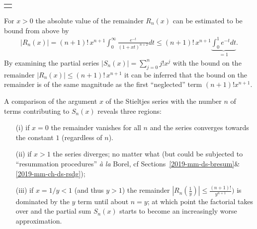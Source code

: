 {\begin{marginfigure}
{\begin{center}
\begin{tabular}{c}
\begin{tikzpicture} [ scale=0.53, every mark/.append style={mark size=2pt} ]
\begin{axis}
\end{axis}
\end{tikzpicture}
\end{tabular}
\end{center}
\caption{The series approximation error   $F_n(x)= -\frac{e^\frac{1}{x}}{x}  \left[  \gamma - \log x +\sum_{j=1}^n \frac{(-1)^j}{j!j x^j} \right] -S(x)$
of the convergent Stieltjes series~(\ref{2019-m-ch-ds-Stieltjes-series})
for $x=\frac{1}{5}$, and
$E_n(x)=S_n(x) -S(x)$
of the Stieltjes series~(\ref{2019-m-ch-ds-asymptotic-Stieltjes-series})  as a function of increasing $n$
for $x\in \left\{ \frac{1}{5},\frac{1}{10},\frac{1}{15}\right\}$.}
  \label{2018-mm-ferrorS}
}
\end{marginfigure}
%
%
%
%
For $x>0$ the absolute value of the remainder $R_n(x)$
can be estimated to be bound from above by
\begin{equation}
\begin{split}
\vert R_n(x)\vert
=(n+1)! \, x^{n+1} \int_0^\infty   \frac{e^{-t}}{(1+xt)^{n+2}} dt
\le (n+1)! \, x^{n+1} \underbrace{\int_0^1    e^{-t} dt}_{=1}.
\end{split}
\label{2019-m-ch-ds-Stieltjes-function-pi-re}
\end{equation}
By examining\cite[9mm]{Erdelyi-1956} the partial series $\left| S_n(x) \right|=  \sum_{j=0}^n j! x^j$
with   the bound on the remainder $\left| R_n(x) \right| \le (n+1)!  \, x^{n+1}$
it can be inferred that  the bound on the remainder is of the same magnitude as the
first ``neglected''  term $(n+1)! x^{n+1}$.

A comparison of the argument $x$ of the Stieltjes series
with the number $n$ of terms contributing to $S_n(x)$ reveals three regions:
\begin{itemize}
\item[(i)] if $x=0$ the remainder vanishes for all $n$ and the series converges towards the constant $1$ (regardless of $n$).
\item[(ii)] if $x>1$ the series diverges; no matter what (but could be subjected to ``resummation procedures'' {\it \`a la} Borel,
cf Sections~\ref{2019-mm-ds-bresum}{\&}\ref{2019-mm-ch-ds-rsdg});
\item[(iii)] if $x = 1/y<1$ (and thus $y>1$)  the remainder $
\left| R_n\left(\frac{1}{y}\right) \right| \le \frac{(n+1)!}{y^{n+1}}   )$  is dominated by the $y$ term
until about $n=y$; at which point the factorial takes over and
the partial sum
$S_n(x)$ starts to become an increasingly worse approximation.



\end{itemize}}
